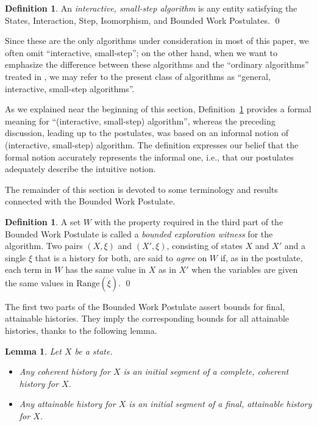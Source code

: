 \documentclass{LMCS}
\newtheorem{la}[thm]{Lemma}
\theoremstyle{definition}
\newtheorem{df}[thm]{Definition}
\newenvironment{ls}{\begin{itemize}}{\end{itemize}}
\newcommand{\ans}{\dot}
\newcommand{\ran}[1]{\ensuremath{{\text{Range}}(#1)}}
\begin{document}
\begin{df}   \label{alg-def}
  An \emph{interactive, small-step algorithm} is any entity satisfying
  the States, Interaction, Step, Isomorphism, and Bounded Work
  Postulates.
\qed\end{df}

Since these are the only algorithms under consideration in most of
this paper, we often omit ``interactive, small-step''; on the other
hand, when we want to emphasize the difference between these
algorithms and the ``ordinary algorithms'' treated in \cite{oa1, oa2,
  oa3}, we may refer to the present class of algorithms as ``general,
interactive, small-step algorithms''.

As we explained near the beginning of this section,
Definition~\ref{alg-def} provides a formal meaning for ``(interactive,
small-step) algorithm'', whereas the preceding discussion, leading up
to the postulates, was based on an informal notion of (interactive,
small-step) algorithm.  The definition expresses our belief that the
formal notion accurately represents the informal one, i.e., that our
postulates adequately describe the intuitive notion.  

The remainder of this section is devoted to some terminology and
results connected with the Bounded Work Postulate.

\begin{df}
  A set $W$ with the property required in the third part of the
Bounded Work Postulate is called a \emph{bounded exploration witness}
for the algorithm.  Two pairs $(X,\xi)$ and $(X',\xi)$, consisting of
states $X$ and $X'$ and a single $\xi$ that is a history for both, are
said to \emph{agree} on $W$ if, as in the postulate, each term in $W$
has the same value in $X$ as in $X'$ when the variables are given the
same values in \ran{\ans\xi}.
\qed\end{df}

The first two parts of the Bounded Work Postulate assert bounds for
final, attainable histories.  They imply the corresponding bounds for
all attainable histories, thanks to the following lemma.

\begin{la}
Let $X$ be a state.
  \begin{ls}
    \item Any coherent history for $X$ is an initial segment of a
    complete, coherent history for $X$.
    \item Any attainable history for $X$ is an initial segment of a final,
    attainable history for $X$.
  \end{ls}
\end{la}
\end{document}
